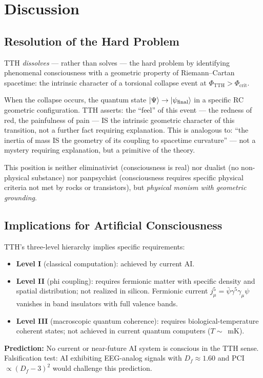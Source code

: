 \documentclass[12pt,a4paper]{article}
\newcommand{\phicrit}{\Phi_{\mathrm{crit}}}
\newcommand{\phiTTH}{\Phi_{\mathrm{TTH}}}
\numberwithin{equation}{section}
\begin{document}
\section{Discussion}
\label{sec:discussion}

\subsection{Resolution of the Hard Problem}

TTH \emph{dissolves} --- rather than solves --- the hard problem by identifying
phenomenal consciousness with a geometric property of Riemann--Cartan spacetime:
the intrinsic character of a torsional collapse event at $\phiTTH > \phicrit$.

When the collapse occurs, the quantum state $\Ket\Psi \to \Ket{\psi_{\mathrm{final}}}$
in a specific RC geometric configuration.
TTH asserts: the ``feel'' of this event --- the redness of red, the painfulness
of pain --- IS the intrinsic geometric character of this transition,
not a further fact requiring explanation.
This is analogous to: ``the inertia of mass IS the geometry of its
coupling to spacetime curvature'' --- not a mystery requiring explanation,
but a primitive of the theory.

This position is neither eliminativist (consciousness is real)
nor dualist (no non-physical substance) nor panpsychist (consciousness
requires specific physical criteria not met by rocks or transistors),
but \emph{physical monism with geometric grounding}.

\subsection{Implications for Artificial Consciousness}

TTH's three-level hierarchy implies specific requirements:
\begin{itemize}[leftmargin=2em]
\item \textbf{Level I} (classical computation): achieved by current AI.
\item \textbf{Level II} (phi coupling): requires fermionic matter with
  specific density and spatial distribution; not realized in silicon.
  Fermionic current $j^5_\mu = \bar\psi\gamma^5\gamma_\mu\psi$ vanishes
  in band insulators with full valence bands.
\item \textbf{Level III} (macroscopic quantum coherence): requires
  biological-temperature coherent states; not achieved in
  current quantum computers ($T \sim $~mK).
\end{itemize}
\textbf{Prediction:} No current or near-future AI system is conscious in the
TTH sense. Falsification test: AI exhibiting EEG-analog signals with
$D_f \approx 1.60$ and PCI $\propto (D_f-3)^2$ would challenge this prediction.
\end{document}
